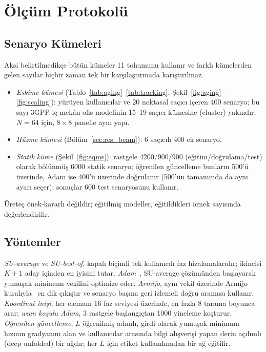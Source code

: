 \section{Ölçüm Protokolü}
\label{sec:method}

\subsection{Senaryo Kümeleri}
Aksi belirtilmedikçe bütün kümeler 11 tohumunu kullanır ve farklı kümelerden gelen sayılar hiçbir zaman tek bir karşılaştırmada karıştırılmaz.
\begin{itemize}
    \item \emph{Eskime kümesi} (Tablo~\ref{tab:aging}--\ref{tab:tracking}, Şekil~\ref{fig:aging}--\ref{fig:scaling}): yürüyen kullanıcılar ve 20 noktasal saçıcı içeren 400 senaryo; bu sayı 3GPP iç mekân ofis modelinin 15--19 saçıcı kümesine (cluster) yakındır; $N=64$ için, $8\times 8$ panelle aynı yapı.
    \item \emph{Hüzme kümesi} (Bölüm~\ref{sec:res_beam}): 6 saçıcılı 400 ek senaryo.
    \item \emph{Statik küme} (Şekil~\ref{fig:eqms}): rastgele 4200/900/900 (eğitim/doğrulama/test) olarak bölünmüş 6000 statik senaryo; öğrenilen güncelleme bunların 500'ü üzerinde, Adam ise 400'ü üzerinde doğrulanır (500'ün tamamında da aynı ayarı seçer); sonuçlar 600 test senaryosunu kullanır.
\end{itemize}
Üreteç önek-kararlı değildir; eğitilmiş modeller, eğitildikleri örnek sayısında değerlendirilir.

\subsection{Yöntemler}
\emph{SU-average} ve \emph{SU-best-of}, kapalı biçimli tek kullanıcılı faz hizalamalarıdır; ikincisi $K{+}1$ aday içinden en iyisini tutar. \emph{Adam}~\cite{Kingma2015ICLR}, SU-average çözümünden başlayarak yumuşak minimum vekilini optimize eder. \emph{Armijo}, aynı vekil üzerinde Armijo kuralıyla~\cite{Armijo1966PJM} en dik çıkıştır ve senaryo başına geri izlemeli doğru araması kullanır. \emph{Koordinat inişi}, her elemanı 16 faz seviyesi üzerinde, en fazla 8 tarama boyunca arar; \emph{uzun koşulu Adam}, 3 rastgele başlangıçtan 1000 yineleme koşturur. \emph{Öğrenilen güncelleme}, $L$ öğrenilmiş adımlı, girdi olarak yumuşak minimum hızının gradyanını alan ve kullanıcılar arasında bilgi alışverişi yapan derin açılımlı (deep-unfolded) bir ağdır; her $L$ için etiket kullanılmadan bir ağ eğitilir.

